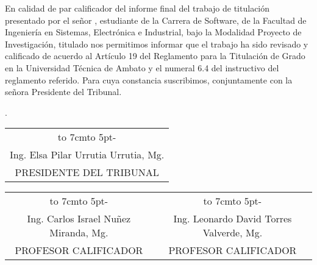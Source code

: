 \newpage
{}
En calidad de par calificador del informe final del trabajo de titulación presentado por el señor \autor, estudiante de la Carrera de Software,
de la Facultad de Ingeniería en Sistemas,
Electrónica e Industrial, bajo la Modalidad Proyecto de Investigación, titulado
	{\MakeUppercase\tema}
nos permitimos informar que el trabajo ha sido revisado
y calificado de acuerdo al Artículo 19 del Reglamento para la Titulación de Grado en
la Universidad Técnica de Ambato y el numeral 6.4 del instructivo del reglamento
referido. Para cuya constancia suscribimos, conjuntamente con la señora Presidente
del Tribunal.
\begin{flushright}
	\lugarFechaPrelims.
\end{flushright}


\vspace*{4cm}
\begin{center}
	\begin{tabular}{c}
		\hbox to 7cm{\leaders\hbox to 5pt{\hss - \hss}\hfil} \\
		Ing. Elsa Pilar Urrutia Urrutia, Mg.                 \\
		PRESIDENTE DEL TRIBUNAL                              \\
	\end{tabular}
\end{center}
\vspace*{20mm}
\begin{center}
	\begin{tabular}{c c}
		\hbox to 7cm{\leaders\hbox to 5pt{\hss - \hss}\hfil} & \hbox to 7cm{\leaders\hbox to 5pt{\hss - \hss}\hfil} \\
		Ing. Carlos Israel Nuñez Miranda, Mg.                & Ing. Leonardo David Torres Valverde, Mg.             \\
		PROFESOR CALIFICADOR                                 & PROFESOR CALIFICADOR
	\end{tabular}
\end{center}
